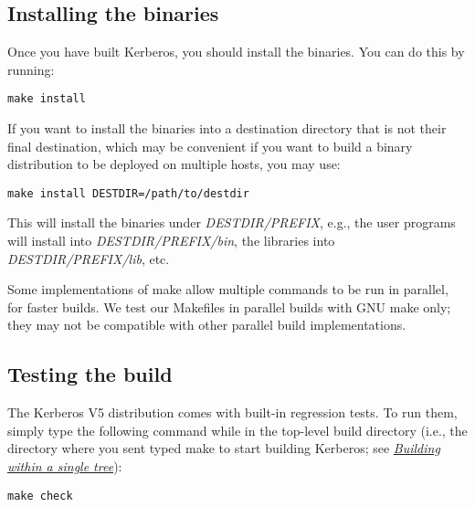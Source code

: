 \documentclass[letterpaper,10pt,english]{sphinxmanual}
\begin{document}
\subsection{Installing the binaries}
\label{build/doing_build:installing-the-binaries}
Once you have built Kerberos, you should install the binaries. You can
do this by running:

\begin{Verbatim}[commandchars=\\\{\}]
make install
\end{Verbatim}

If you want to install the binaries into a destination directory that
is not their final destination, which may be convenient if you want to
build a binary distribution to be deployed on multiple hosts, you may
use:

\begin{Verbatim}[commandchars=\\\{\}]
make install DESTDIR=/path/to/destdir
\end{Verbatim}

This will install the binaries under \emph{DESTDIR/PREFIX}, e.g., the user
programs will install into \emph{DESTDIR/PREFIX/bin}, the libraries into
\emph{DESTDIR/PREFIX/lib}, etc.

Some implementations of make allow multiple commands to be run in
parallel, for faster builds.  We test our Makefiles in parallel builds
with GNU make only; they may not be compatible with other parallel
build implementations.


\subsection{Testing the build}
\label{build/doing_build:testing-the-build}
The Kerberos V5 distribution comes with built-in regression tests.  To
run them, simply type the following command while in the top-level
build directory (i.e., the directory where you sent typed make to
start building Kerberos; see {\hyperref[build/doing_build:do-build]{\emph{Building within a single tree}}}):

\begin{Verbatim}[commandchars=\\\{\}]
make check
\end{Verbatim}
\end{document}
